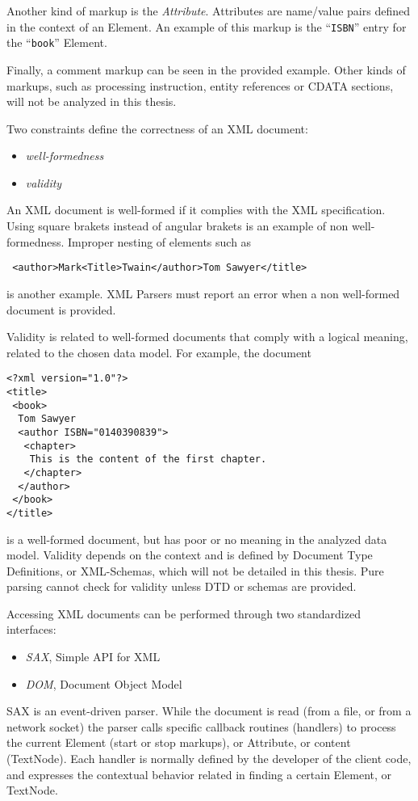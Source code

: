 Another kind of markup is the \textit{Attribute}. Attributes are name/value
pairs defined in the context of an Element. An example of this markup is the
``\texttt{ISBN}'' entry for the ``\texttt{book}'' Element.

Finally, a comment markup can be seen in the provided example.  Other kinds
of markups, such as processing instruction, entity references or CDATA
sections, will not be analyzed in this thesis.

Two constraints define the correctness of an XML document:
\begin{itemize}
\item \textit{well-formedness}
\item \textit{validity}
\end{itemize}

An XML document is well-formed if it complies with the XML specification.
Using square brakets instead of angular brakets is an example of non
well-formedness. Improper nesting of elements such as
\begin{verbatim}
 <author>Mark<Title>Twain</author>Tom Sawyer</title>
\end{verbatim}
is another example. XML Parsers must report an error when a non well-formed
document is provided.

Validity is related to well-formed documents that comply with a logical
meaning, related to the chosen data model. 
For example, the document
\begin{verbatim}
<?xml version="1.0"?>
<title>
 <book>
  Tom Sawyer
  <author ISBN="0140390839">
   <chapter>
    This is the content of the first chapter.
   </chapter>
  </author>
 </book>
</title>
\end{verbatim}
is a well-formed document, but has poor or no meaning in the analyzed data
model. Validity depends on the context and is defined by Document Type
Definitions, or XML-Schemas, which will not be detailed in this thesis. Pure
parsing cannot check for validity unless DTD or schemas are provided.

Accessing XML documents can be performed through two standardized interfaces:

\begin{itemize}
\item \textit{SAX}, Simple API for XML
\item \textit{DOM}, Document Object Model
\end{itemize}

SAX is an event-driven parser. While the document is read (from a file, or
from a network socket) the parser calls specific callback routines (handlers) to
process the current Element (start or stop markups), or Attribute, or
content (TextNode). Each handler is normally defined by the developer of the
client code, and expresses the contextual behavior related in finding a
certain Element, or TextNode.

